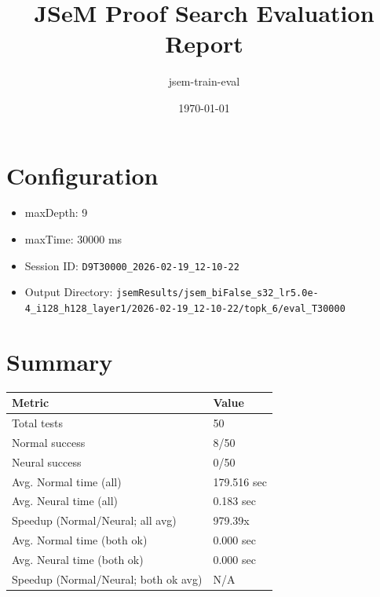 \documentclass[a4paper,10pt]{article}
\title{JSeM Proof Search Evaluation Report}
\author{jsem-train-eval}
\date{\today}
\begin{document}
\maketitle

\section{Configuration}
\begin{itemize}
\item maxDepth: 9
\item maxTime: 30000 ms
\item Session ID: \texttt{D9T30000\_2026-02-19\_12-10-22}
\item Output Directory: \texttt{jsemResults/jsem\_biFalse\_s32\_lr5.0e-4\_i128\_h128\_layer1/2026-02-19\_12-10-22/topk\_6/eval\_T30000}
\end{itemize}

\section{Summary}
\begin{tabular}{ll}
\toprule
\textbf{Metric} & \textbf{Value} \\
\midrule
Total tests & 50 \\
Normal success & 8/50 \\
Neural success & 0/50 \\
\midrule
Avg. Normal time (all) & 179.516 sec \\
Avg. Neural time (all) & 0.183 sec \\
Speedup (Normal/Neural; all avg) & 979.39x \\
Avg. Normal time (both ok) & 0.000 sec \\
Avg. Neural time (both ok) & 0.000 sec \\
Speedup (Normal/Neural; both ok avg) & N/A \\
\bottomrule
\end{tabular}
\end{document}
